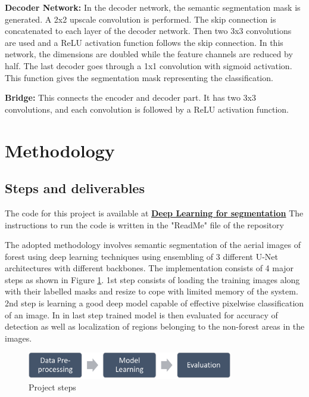 \documentclass[rnd]{mas_proposal}
\begin{document}
\textbf{Decoder Network:} In the decoder network, the semantic segmentation mask is generated. A 2x2 upscale convolution is performed. The skip connection is concatenated to each layer of the decoder network. Then two 3x3 convolutions are used and a ReLU activation function follows the skip connection. In this network, the dimensions are doubled while the feature channels are reduced by half. 
The last decoder goes through a 1x1 convolution with sigmoid activation. This function gives the segmentation mask representing the classification.

\textbf{Bridge:} This connects the encoder and decoder part. It has two 3x3 convolutions, and each convolution is followed by a ReLU activation function.

\newpage
\section{Methodology}

\subsection{Steps and deliverables}

The code for this project is available at \href{https://github.com/SimonDeussen/dope-drone-desegmentation-dlrv.git}{\textbf{Deep Learning for segmentation}}
The instructions to run the code is written in the "ReadMe" file of the repository

\vspace{10px}

The adopted methodology involves semantic segmentation of the aerial images of forest using deep learning techniques 
using ensembling of 3 different U-Net architectures with different backbones. The implementation consists of 4 major steps as shown in Figure \ref{fig:steps}. 
1st step consists of loading the training images along with their labelled masks and resize to cope with limited memory of the system.  2nd step is learning a 
good deep model capable of effective pixelwise classification of an image. In in last step trained model is then evaluated for accuracy of detection as well 
as localization of regions belonging to the non-forest areas in the images. 
\begin{figure}[htp] 
        \centering
        \includegraphics[width=0.8\textwidth]{images/fig3.png}
        \caption{Project steps}%
        \label{fig:steps}%
\end{figure}
\end{document}
